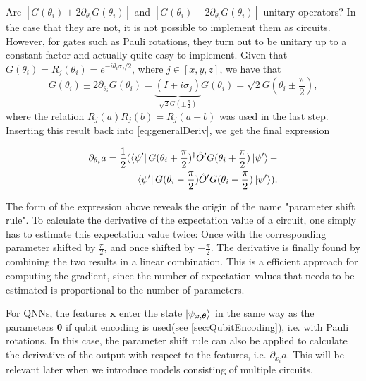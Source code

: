 Are $[G(\theta_i)+2\partial_{\theta_i}G(\theta_i)]$ and $[G(\theta_i)-2\partial_{\theta_i}G(\theta_i)]$ unitary operators? In the case that they are not, it is not possible to implement them as circuits. However, for gates such as Pauli rotations, they turn out to be unitary up to a constant factor and actually quite easy to implement. Given that $G(\theta_i) = R_j(\theta_i) = e^{-i\theta_i \sigma_j/2}$, where $j \in [x,y,z]$, we have that 
\begin{equation}
    G(\theta_i)\pm2\partial_{\theta_i}G(\theta_i) = 
    \underset{\sqrt{2}G(\pm \frac{\pi}{2})}{\underbrace{(I \mp i\sigma_j)}}G(\theta_i) = 
    \sqrt{2}G(\theta_i \pm \frac{\pi}{2}),
\end{equation}
where the relation $R_j(a)R_j(b) = R_j(a+b)$ was used in the last step. Inserting this result back into \autoref{eq:generalDeriv}, we get the final expression 


\begin{equation}\label{eq:parameterShiftRule}
\begin{aligned}
    \partial_{\theta_i} a = 
    \frac{1}{2}(
    \bra{\psi'} G(\theta_i + \frac{\pi}{2})^{\dagger} \hat{O}' G(\theta_i + \frac{\pi}{2}) \ket{\psi'} -\\
    \bra{\psi'} G(\theta_i - \frac{\pi}{2}) \hat{O}' G(\theta_i - \frac{\pi}{2}) \ket{\psi'}).
\end{aligned}
\end{equation}

The form of the expression above reveals the origin of the name "parameter shift rule". To calculate the derivative of the expectation value of a circuit, one simply has to estimate this expectation value twice: Once with the corresponding parameter shifted by $\frac{\pi}{2}$, and once shifted by $-\frac{\pi}{2}$. The derivative is finally found by combining the two results in a linear combination. This is a efficient approach for computing the gradient, since the number of expectation values that needs to be estimated is proportional to the number of parameters.

For QNNs, the features $\boldsymbol{x}$ enter the state $\ket{\psi_{\boldsymbol{x},\boldsymbol{\theta}}}$ in the same way as the parameters $\boldsymbol{\theta}$ if qubit encoding is used(see \autoref{sec:QubitEncoding}), i.e. with Pauli rotations. In this case, the parameter shift rule can also be applied to calculate the derivative of the output with respect to the features, i.e. $\partial_{x_i}a$. This will be relevant later when we introduce models consisting of multiple circuits. 

